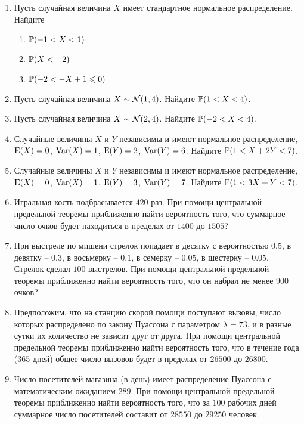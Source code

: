 \begin{enumerate}
\item Пусть случайная величина $X$ имеет стандартное нормальное распределение.
Найдите
\begin{enumerate}
\item $\P(-1 < X < 1)$
\item $\P(X < -2)$
\item $\P(-2 < -X + 1 \leq 0)$
\end{enumerate}

\item Пусть случайная величина $X \sim \cN(1,4)$. Найдите $\P(1<X<4)$.

\item Пусть случайная величина $X \sim \cN(2,4)$. Найдите $\P(-2<X<4)$.

\item Случайные величины $X$ и $Y$ независимы и  имеют нормальное распределение,
$\E(X) = 0 $, $\Var(X) = 1$, $\E(Y) = 2$, $\Var(Y) = 6$. Найдите $\P(1 < X + 2Y < 7)$.

\item Случайные величины $X$ и $Y$ независимы и  имеют нормальное распределение,
$\E(X) = 0 $, $\Var(X) = 1$, $\E(Y) = 3$, $\Var(Y) = 7$. Найдите $\P(1 < 3X + Y < 7)$.

\item Игральная кость подбрасывается $420$ раз.
При помощи центральной предельной теоремы приближенно найти вероятность того,
что суммарное число очков будет находиться в пределах от $1400$ до $1505$?

\item При выстреле по мишени стрелок попадает в десятку с вероятностью $0.5$,
в девятку – $0.3$, в восьмерку – $0.1$, в семерку – $0.05$, в шестерку – $0.05$.
Стрелок сделал $100$ выстрелов.
При помощи центральной предельной теоремы приближенно найти вероятность того,
что он набрал не менее $900$ очков?

\item Предположим, что на станцию скорой помощи поступают вызовы,
число которых распределено по закону Пуассона с параметром $\lambda = 73$,
и в разные сутки их количество не зависит друг от друга.
При помощи центральной предельной теоремы приближенно найти вероятность того,
что в течение года (365 дней) общее число вызовов будет в пределах от $26500$ до $26800$.

\item Число посетителей магазина (в день) имеет распределение Пуассона
с математическим ожиданием $289$.
При помощи центральной предельной теоремы приближенно найти вероятность того,
что за $100$ рабочих дней суммарное число посетителей составит
от $28550$ до $29250$ человек.


\end{enumerate}
